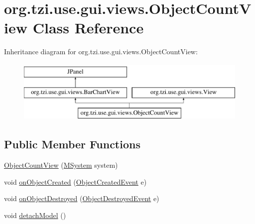 \hypertarget{classorg_1_1tzi_1_1use_1_1gui_1_1views_1_1_object_count_view}{\section{org.\-tzi.\-use.\-gui.\-views.\-Object\-Count\-View Class Reference}
\label{classorg_1_1tzi_1_1use_1_1gui_1_1views_1_1_object_count_view}
}
Inheritance diagram for org.\-tzi.\-use.\-gui.\-views.\-Object\-Count\-View\-:\begin{figure}[H]
\begin{center}
\leavevmode
\includegraphics[height=3.000000cm]{classorg_1_1tzi_1_1use_1_1gui_1_1views_1_1_object_count_view}
\end{center}
\end{figure}
\subsection*{Public Member Functions}
\begin{DoxyCompactItemize}
\item 
\hyperlink{classorg_1_1tzi_1_1use_1_1gui_1_1views_1_1_object_count_view_a3f25bd19aa2870909eef89cac6a734a9}{Object\-Count\-View} (\hyperlink{classorg_1_1tzi_1_1use_1_1uml_1_1sys_1_1_m_system}{M\-System} system)
\item 
void \hyperlink{classorg_1_1tzi_1_1use_1_1gui_1_1views_1_1_object_count_view_ab7016abdbd443eb1660c83d1cc494bdd}{on\-Object\-Created} (\hyperlink{classorg_1_1tzi_1_1use_1_1uml_1_1sys_1_1events_1_1_object_created_event}{Object\-Created\-Event} e)
\item 
void \hyperlink{classorg_1_1tzi_1_1use_1_1gui_1_1views_1_1_object_count_view_a0749ebd7e3e3c56a7c6208b601dfd40c}{on\-Object\-Destroyed} (\hyperlink{classorg_1_1tzi_1_1use_1_1uml_1_1sys_1_1events_1_1_object_destroyed_event}{Object\-Destroyed\-Event} e)
\item 
void \hyperlink{classorg_1_1tzi_1_1use_1_1gui_1_1views_1_1_object_count_view_a38ceb767fb87749cafc6bfeb39f9acd0}{detach\-Model} ()
\end{DoxyCompactItemize}


